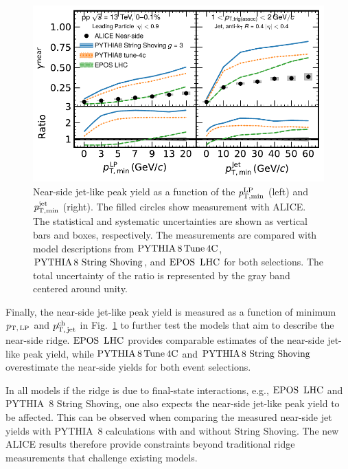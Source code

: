 \begin{figure}[h!]
	\centering
	\includegraphics[width=0.89\linewidth]{./figures/Fig9_JetYieldESE.pdf}
	\caption{ Near-side jet-like peak yield as a function of the $\it{p}^{\rm{LP}}_{\rm{T,min}}$ (left) and $\it{p}^{\rm{jet}}_{\rm{T,min}}$ (right). The filled circles show measurement with ALICE. The statistical and systematic uncertainties are shown as vertical bars and boxes, respectively. The measurements are compared with model descriptions from $\mathrm{PYTHIA}\,8\,\mathrm{Tune\,4C}$, ${\mathrm{PYTHIA}\,8~\mathrm{String}~}\mathrm{Shoving}$, and ${\mathrm{EPOS}\,~\mathrm{LHC}}$ for both selections. The total uncertainty of the ratio is represented by the gray band centered around unity.}
	\label{fig:JetYield_ESE}
\end{figure}

Finally, the near-side jet-like peak yield is measured as a function of minimum $p_\mathrm{T,\,LP}$ and $p_\mathrm{T,\,jet}^\mathrm{ch}$ in Fig.~\ref{fig:JetYield_ESE} to further test the models that aim to describe the near-side ridge. ${\mathrm{EPOS}\,~\mathrm{LHC}}$ provides comparable estimates of the near-side jet-like peak yield, while $\mathrm{PYTHIA}\,8\,\mathrm{Tune\,4C}$ and ${\mathrm{PYTHIA}\,8~\mathrm{String}~}\mathrm{Shoving}$ overestimate the near-side yields for both event selections.

In all models if the ridge is due to final-state interactions, e.g., ${\mathrm{EPOS}\,~\mathrm{LHC}}$ and PYTHIA~8 String Shoving, one also expects the near-side jet-like peak yield to be affected. This can be observed when comparing the measured near-side jet yields with PYTHIA~8 calculations with and without String Shoving. The new ALICE results therefore provide constraints beyond traditional ridge measurements that challenge existing models.